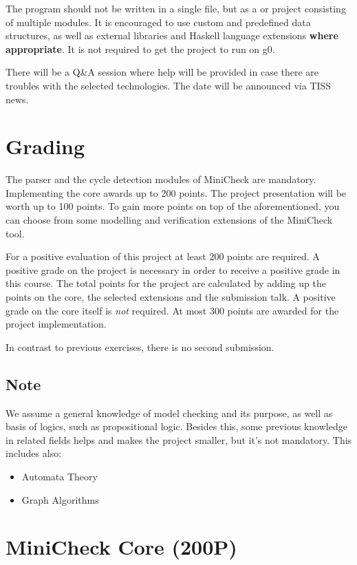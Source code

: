 \documentclass{article}
\begin{document}
The program should not be written in a single file, but as a \href{https://docs.haskellstack.org/en/stable/README/}{} 
or \href{https://cabal.readthedocs.io/en/3.4/}{} project consisting of multiple modules. 
It is encouraged to use custom and predefined data structures, as well as external libraries 
and Haskell language extensions \textbf{where appropriate}. It is not required to get the project to run on g0.

There will be a Q\&A session where help will be provided in case there are troubles with the selected technologies. 
The date will be announced via TISS news.

\section{Grading}

The parser and the cycle detection modules of MiniCheck are mandatory. 
Implementing the core awards up to 200 points. The project presentation will be worth up to 100 points. 
To gain more points on top of the aforementioned, you can choose from some modelling 
and verification extensions of the MiniCheck tool.

For a positive evaluation of this project at least 200 points are required. 
A positive grade on the project is necessary in order to receive a positive grade in this course. 
The total points for the project are calculated by adding up the points on the core, 
the selected extensions and the submission talk. A positive grade on the core itself is \textit{not} required. 
At most 300 points are awarded for the project implementation.

In contrast to previous exercises, there is no second submission.

\subsection{Note}
We assume a general knowledge of model checking and its purpose, as well as basis of logics,
such as propositional logic.  Besides this, some previous knowledge in related fields helps 
and makes the project smaller, but it's not mandatory. This includes also:
\begin{itemize}
    \item Automata Theory
    \item Graph Algorithms
\end{itemize}

\section{MiniCheck Core (200P)}
\end{document}
